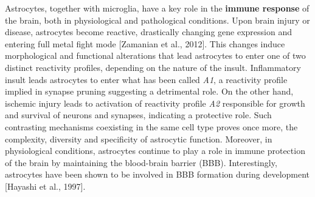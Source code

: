 Astrocytes, together with microglia, have a key role in the \textbf{immune response} of the brain, both in physiological and pathological conditions.
Upon brain injury or disease, astrocytes become reactive, drastically changing gene expression and entering full metal fight mode [Zamanian et al., 2012].
This changes induce morphological and functional alterations that lead astrocytes to enter one of two distinct reactivity profiles, depending on the nature of the insult. 
Inflammatory insult leads astrocytes to enter what has been called \textit{A1}, a reactivity profile implied in synapse pruning suggesting a detrimental role.
On the other hand, ischemic injury leads to activation of reactivity profile \textit{A2} responsible for growth and survival of neurons and synapses, indicating a protective role. 
Such contrasting mechanisms coexisting in the same cell type proves once more, the complexity, diversity and specificity of astrocytic function. 
Moreover, in physiological conditions, astrocytes continue to play a role in immune protection of the brain by maintaining the blood-brain barrier (BBB). 
Interestingly, astrocytes have been shown to be involved in BBB formation during development [Hayashi et al., 1997]. 

